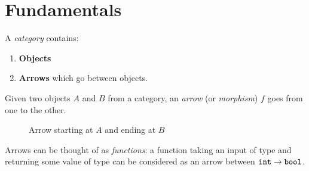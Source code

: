 \section{Fundamentals}

\begin{definition}[Category]
    A \textit{category} contains:
    \begin{enumerate}
        \item \textbf{Objects}
        \item \textbf{Arrows} which go between objects.
    \end{enumerate}
\end{definition}

\begin{definition}
    Given two objects $A$ and $B$ from a category, an \textit{arrow} (or \textit{morphism}) $f$ goes from one to the other.
    
    \begin{figure}[H]
        \centering
        \caption{Arrow starting at $A$ and ending at $B$}
        \label{fig:arrow}
    \end{figure}
\end{definition}

\begin{remark}
    Arrows can be thought of as \textit{functions}: a function taking an input of type  and returning some value of type  can be considered as an arrow between $\mathtt{int} \to \mathtt{bool}$.
\end{remark}

